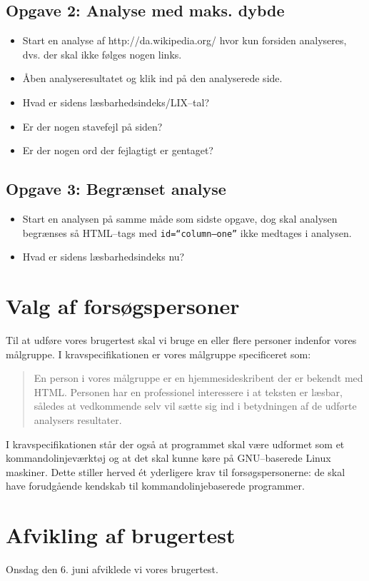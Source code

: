 \documentclass[a4paper,oneside,article]{memoir}
\begin{document}
\subsection{Opgave 2: Analyse med maks. dybde}
\begin{itemize}
\item Start en analyse af http://da.wikipedia.org/ hvor kun forsiden
  analyseres, dvs. der skal ikke følges nogen links.
\item Åben analyseresultatet og klik ind på den analyserede side.
\item Hvad er sidens læsbarhedsindeks/LIX--tal?
\item Er der nogen stavefejl på siden?
\item Er der nogen ord der fejlagtigt er gentaget?
\end{itemize}

\subsection{Opgave 3: Begrænset analyse}
\begin{itemize}
\item Start en analysen på samme måde som sidste opgave, dog skal
  analysen begrænses så HTML--tags med \texttt{id=``column--one''} ikke
  medtages i analysen.
\item Hvad er sidens læsbarhedsindeks nu?
\end{itemize}

\section{Valg af forsøgspersoner}
Til at udføre vores brugertest skal vi bruge en eller flere personer
indenfor vores målgruppe. I kravspecifikationen er vores målgruppe
specificeret som:
\begin{quote}
En person i vores målgruppe er en hjemmesideskribent der er bekendt
med HTML. Personen har en professionel interessere i at teksten er
læsbar, således at vedkommende selv vil sætte sig ind i betydningen af
de udførte analysers resultater.
\end{quote}

I kravspecifikationen står der også at programmet skal være udformet
som et kommandolinjeværktøj og at det skal kunne køre på GNU--baserede
Linux maskiner. Dette stiller herved ét yderligere krav til
forsøgspersonerne: de skal have forudgående kendskab til
kommando\-linje\-baserede programmer.

\section{Afvikling af brugertest}
Onsdag den 6. juni afviklede vi vores brugertest.
\end{document}
